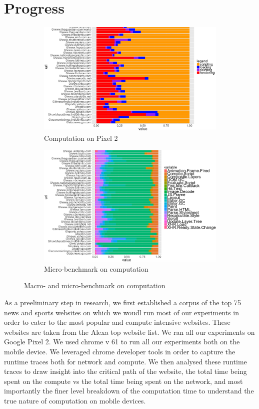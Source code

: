 \section{Progress}
\label{sec:Progress}

\begin{figure}[!bth]
\begin{subfigure}[b]{0.5\textwidth}
\includegraphics[width=0.99\linewidth]{figs/comp_1.png}
\caption{Computation on Pixel 2}
\label{fig:act_p2}
\end{subfigure}
\begin{subfigure}[b]{0.5\textwidth}
\includegraphics[width=\linewidth]{figs/comp_2.png}
\caption{Micro-benchmark on computation}
\label{fig:cat_p2}
\end{subfigure}
\caption{Macro- and micro-benchmark on computation}
\end{figure}

As a preeliminary step in research, we first established a corpus of the top
75 news and sports websites on which we woudl run most of our experiments
in order to cater to the most popular and compute intensive websites. 
These websites are taken from the Alexa top website list.
We ran all our experiments on  Google Pixel 2. We used chrome v 61 to run all  our experiments
both on the mobile device. We leveraged chrome developer tools in order
to capture the runtime traces both for network and compute. We then analysed these runtime
traces to draw insight into the critical path of the website, the total time being spent on the 
compute vs the total time being spent on the network, and most importantly the finer
level breakdown of the computation time to understand the true nature of computation on mobile
devices. 

